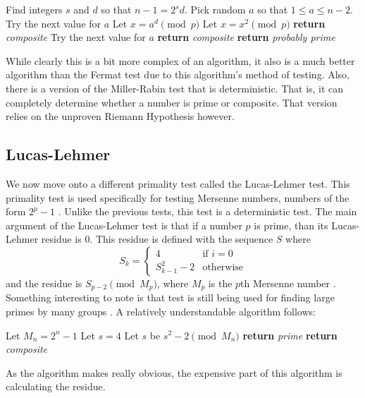 \documentclass[11pt]{article}
\begin{document}
\begin{algorithm}[H]
\begin{algorithmic}[0]
    \State Find integers $s$ and $d$ so that $n-1 = 2^sd$.
        \State Pick random $a$ so that $1 \le a \le n-2$.
            \State Try the next value for $a$
        \EndIf
        \State Let $x = a^d \pmod{p}$
            \State Let $x = x^2 \pmod{p}$ 
                \State \textbf{return} \emph{composite}
                \State Try the next value for $a$
            \EndIf
        \EndFor
        \State \textbf{return} \emph{composite}
    \EndFor
    \State \textbf{return} \emph{probably prime}
    \EndProcedure
\end{algorithmic}
\end{algorithm}

While clearly this is a bit more complex of an algorithm, it also is a much
better algorithm than the Fermat test due to this algorithm's method of testing.
Also, there is a version of the Miller-Rabin test that is deterministic.
That is, it can completely determine whether a number is prime or composite.
That version relies on the unproven Riemann Hypothesis however.

\subsection*{Lucas-Lehmer}
We now move onto a different primality test called the Lucas-Lehmer test.
This primality test is used specifically for testing Mersenne numbers, numbers
of the form $2^p -1$ \cite{MersennePrimeTests}.
Unlike the previous tests, this test is a deterministic test.
The main argument of the Lucas-Lehmer test is that if a number $p$ is prime, than
its Lucas-Lehmer residue is 0.
This residue is defined with the sequence $S$ where
\[S_k = \begin{cases} 4 &\text{if } i=0\\ S^2_{k-1} -2 &\text{otherwise}\end{cases}\]
and the residue is $S_{p-2} \pmod{M_p}$, where $M_p$ is
the $p$th Mersenne number \cite{wLucasLehmerTest}.
Something interesting to note is that test is still being used for finding
large primes by many groups \cite{qLucasLehmerTest}.
A relatively understandable algorithm follows:

\begin{algorithm}[H]
\begin{algorithmic}
    \State Let $M_n=2^n-1$
    \State Let $s=4$
        \State Let $s$ be $s^2 - 2 \pmod{M_n}$
    \EndFor
        \State \textbf{return} \emph{prime}
    \EndIf
    \State \textbf{return} \emph{composite}
    \EndProcedure
\end{algorithmic}
\end{algorithm}
As the algorithm makes really obvious, the expensive part of this algorithm is
calculating the residue.
\end{document}
